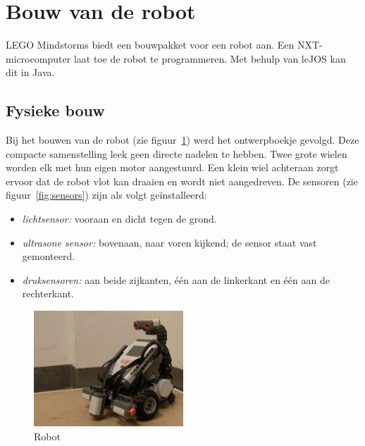 \documentclass[eind]{penoverslag}
\begin{document}
\section{Bouw van de robot} %
\label{sec:bouw}
LEGO Mindstorms \cite{mindstorms} biedt een bouwpakket voor een robot aan. Een NXT-microcomputer laat toe de robot te programmeren. Met behulp van leJOS \cite{leJOS} kan dit in Java.

\subsection{Fysieke bouw} %
\label{ssec:fysbouw}
Bij het bouwen van de robot (zie figuur~\ref{robot}) werd het ontwerpboekje gevolgd. Deze compacte samenstelling leek geen directe nadelen te hebben. Twee grote wielen worden elk met hun eigen motor aangestuurd. Een klein wiel achteraan zorgt ervoor dat de robot vlot kan draaien en wordt niet aangedreven. De sensoren (zie figuur~\ref{fig:sensors}) zijn als volgt ge\"installeerd: 

\begin{itemize}
\item \textit{lichtsensor:} vooraan en dicht tegen de grond.
\item \textit{ultrasone sensor:} bovenaan, naar voren kijkend; de sensor staat vast gemonteerd.
\item \textit{druksensoren:} aan beide zijkanten, \'e\'en aan de linkerkant en \'e\'en aan de rechterkant.
\end{itemize}

\begin{figure}[tbp]
\begin{center}
    \includegraphics[width=0.5\textwidth]{robot}
    \caption{Robot}
    \label{robot}
\end{center}
\end{figure}
\end{document}
